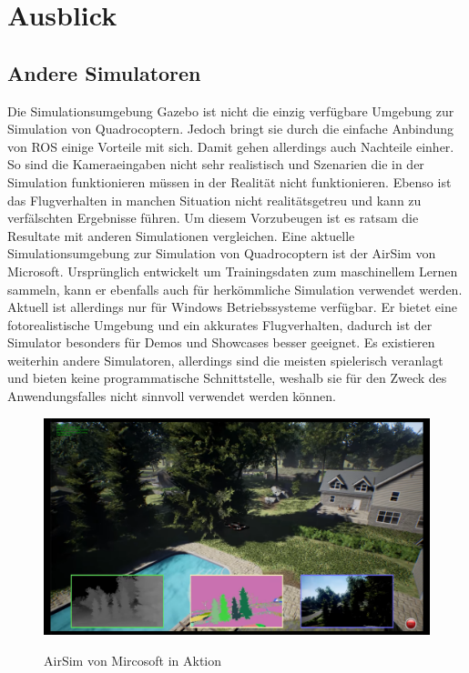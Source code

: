 \section{Ausblick}
\subsection{Andere Simulatoren}
Die Simulationsumgebung Gazebo ist nicht die einzig verfügbare Umgebung zur Simulation von Quadrocoptern. Jedoch bringt sie durch die einfache Anbindung von ROS einige Vorteile mit sich. Damit gehen allerdings auch Nachteile einher. So sind die Kameraeingaben nicht sehr realistisch und Szenarien die in der Simulation funktionieren müssen in der Realität nicht funktionieren. Ebenso ist das Flugverhalten in manchen Situation nicht realitätsgetreu und kann zu verfälschten Ergebnisse führen. Um diesem Vorzubeugen ist es ratsam die Resultate mit anderen Simulationen vergleichen. Eine aktuelle Simulationsumgebung zur Simulation von Quadrocoptern ist der AirSim von Microsoft.\cite{airsim} Ursprünglich entwickelt um Trainingsdaten zum maschinellem Lernen sammeln, kann er ebenfalls auch für herkömmliche Simulation verwendet werden. Aktuell ist allerdings nur für Windows Betriebssysteme verfügbar. \cite{airsimpaper} Er bietet eine fotorealistische Umgebung und ein akkurates Flugverhalten, dadurch ist der Simulator besonders für Demos und Showcases besser geeignet. \newline
Es existieren weiterhin andere Simulatoren, allerdings sind die meisten spielerisch veranlagt und bieten keine programmatische Schnittstelle, weshalb sie für den Zweck des Anwendungsfalles nicht sinnvoll verwendet werden können.
\begin{figure}[ht]
	\centering
	\includegraphics[scale=0.28]{Bilder/airsim.png}
	\label{fig:airsim}
	\caption{AirSim von Mircosoft in Aktion\cite{airsim}}
\end{figure}



